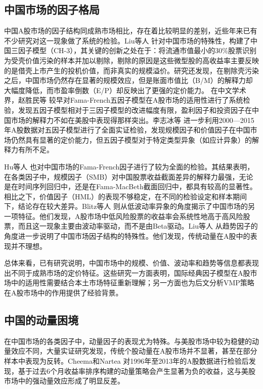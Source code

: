 \documentclass[
    decl-page,
    oneside,
  ]{njuthesis}
\begin{document}
\subsection{中国市场的因子格局}

中国A股市场的因子结构同成熟市场相比，存在着比较明显的差别，近些年来已有不少研究对这一现象做了系统的检验。Liu等人 \cite{liu2019size} 针对中国市场的特殊性，构建了中国三因子模型（CH-3），其关键的创新之处在于：将流通市值最小的$30\%$股票识别为受壳价值污染的样本并加以剔除，剔除的原因是这些微型股的高收益率主要反映的是借壳上市产生的投机价值，而非真实的规模溢价。研究还发现，在剔除壳污染之后，中国市场仍然存在显著的规模效应，但是账面市值比（B/M）的解释力却大幅度降低，而市盈率倒数（E/P）却反映出了更强的定价能力。
在中文学术界，赵胜民等 \cite{zhao2016volatility} 较早对Fama-French五因子模型在A股市场的适用性进行了系统检验，发现五因子模型相对于三因子模型的改进幅度有限，盈利因子和投资因子在中国市场的解释力不如在美股中表现得那样突出。李志冰等 \cite{li2017factor} 进一步利用2000—2015年A股数据对五因子模型进行了全面实证检验，发现规模因子和价值因子在中国市场仍然具有显著的定价能力，但五因子模型对于特定类型异象（如应计异象）的解释力有所不足。

Hu等人 \cite{hu2019chinese} 也对中国市场的Fama-French因子进行了较为全面的检验。其结果表明，在各类因子中，规模因子（SMB）对中国股票收益截面差异的解释力最强，无论是在时间序列回归中，还是在Fama-MacBeth截面回归中，都具有较高的显著性。相比之下，价值因子（HML）的表现不够稳定，在不同的检验设定和样本期间下，结论存在较大差异。Blitz等人 \cite{blitz2021volatility}则从低波动率异象的角度揭示了中国市场的另一项特征。他们发现，A股市场中低风险股票的收益率会系统性地高于高风险股票，而且这一现象主要由波动率驱动，而不是由Beta驱动。Liu等人 \cite{liu2024trend}从趋势因子的角度进一步说明了中国市场因子结构的特殊性。他们发现，传统动量在A股中的表现并不理想。

总体来看，已有研究说明，中国市场中的规模、价值、波动率和趋势等信息都表现出不同于成熟市场的定价特征。这些研究一方面表明，国际经典因子模型在A股市场中的适用性需要结合本土市场特征重新理解；另一方面也为后文分析VMP策略在A股市场中的作用提供了经验背景。

\subsection{中国的动量困境}

在中国市场的各类因子中，动量因子的表现尤为特殊。与美股市场中较为稳健的动量效应不同，大量实证研究发现，传统个股动量在A股市场并不显著，甚至在部分样本中表现为反转。Cheema和Nartea \cite{cheema2018momentum}对1996年至2013年的A股数据进行检验后发现，基于过去6个月收益率排序构建的动量策略会产生显著为负的收益，这与美股市场中的强动量效应形成了明显反差。
\end{document}
